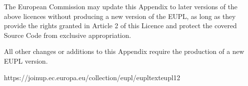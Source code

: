 \documentclass[letterpaper,10pt,english]{sphinxmanual}
\begin{document}
\sphinxAtStartPar
The European Commission may update this Appendix to later versions of the above
licences without producing a new version of the EUPL, as long as they provide
the rights granted in Article 2 of this Licence and protect the covered Source
Code from exclusive appropriation.

\sphinxAtStartPar
All other changes or additions to this Appendix require the production of a new
EUPL version.

\sphinxAtStartPar
https://joinup.ec.europa.eu/collection/eupl/eupl\sphinxhyphen{}text\sphinxhyphen{}eupl\sphinxhyphen{}12


\renewcommand{\indexname}{Python Module Index}
\begin{sphinxtheindex}
\let\bigletter\sphinxstyleindexlettergroup
\bigletter{e}
\item\relax{}
\item\relax{}
\item\relax{}
\end{sphinxtheindex}

\renewcommand{\indexname}{Index}
\printindex
\end{document}
